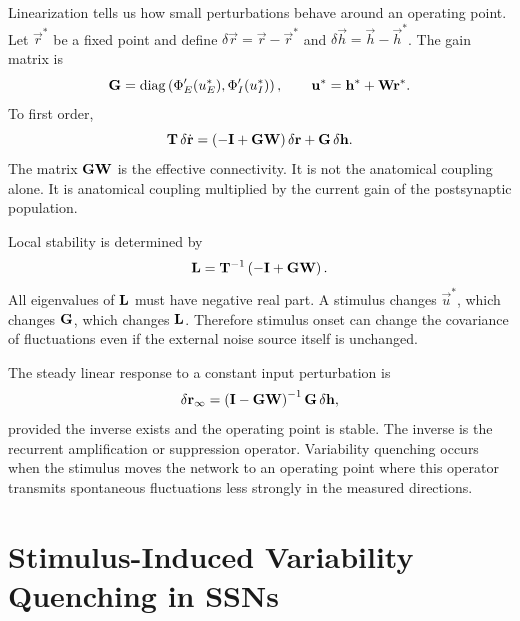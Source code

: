 Linearization tells us how small perturbations behave around an operating point. Let $\vec r^*$ be a fixed point and define $\delta\vec r=\vec r-\vec r^*$ and $\delta\vec h=\vec h-\vec h^*$. The gain matrix is
%
\begin{equation}
  \mathbf{G}
  =
  \operatorname{diag}
  \left(
    \Phi'_E(u_E^*),
    \Phi'_I(u_I^*)
  \right),
  \qquad
  \mathbf{u}^*=\mathbf{h}^*+\mathbf{W}\mathbf{r}^*.
  \label{eq:ssn-gain-matrix}
\end{equation}
%
To first order,
%
\begin{equation}
  \mathbf{T}\,\delta\dot{\mathbf{r}}
  =
  \left(-\mathbf{I}+\mathbf{G}\mathbf{W}\right)\delta\mathbf{r}
  +
  \mathbf{G}\,\delta\mathbf{h}.
  \label{eq:ssn-linearized-dynamics}
\end{equation}
%
The matrix $\mathbf{G}\mathbf{W}$ is the effective connectivity. It is not the anatomical coupling alone. It is anatomical coupling multiplied by the current gain of the postsynaptic population.

Local stability is determined by
%
\begin{equation}
  \mathbf{L}
  =
  \mathbf{T}^{-1}\left(-\mathbf{I}+\mathbf{G}\mathbf{W}\right).
  \label{eq:ssn-linear-operator}
\end{equation}
%
All eigenvalues of $\mathbf{L}$ must have negative real part. A stimulus changes $\vec u^*$, which changes $\mathbf{G}$, which changes $\mathbf{L}$. Therefore stimulus onset can change the covariance of fluctuations even if the external noise source itself is unchanged.

The steady linear response to a constant input perturbation is
%
\begin{equation}
  \delta\mathbf{r}_{\infty}
  =
  \left(\mathbf{I}-\mathbf{G}\mathbf{W}\right)^{-1}
  \mathbf{G}\,\delta\mathbf{h},
  \label{eq:ssn-steady-linear-response}
\end{equation}
%
provided the inverse exists and the operating point is stable. The inverse is the recurrent amplification or suppression operator. Variability quenching occurs when the stimulus moves the network to an operating point where this operator transmits spontaneous fluctuations less strongly in the measured directions.

\section{Stimulus-Induced Variability Quenching in SSNs}
\label{sec:ssn-stimulus-induced-variability-quenching}

